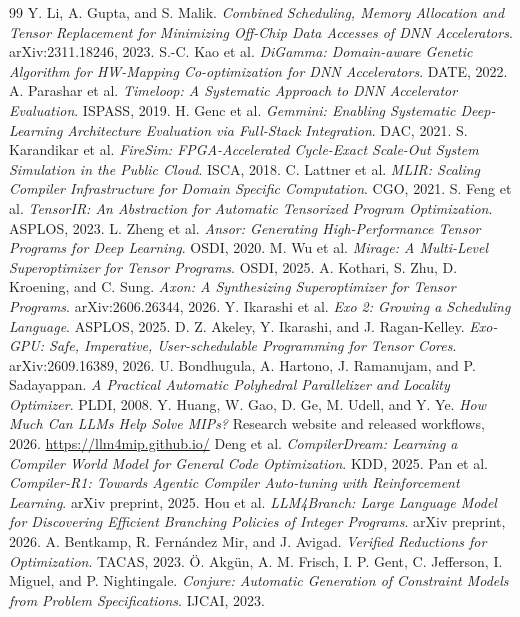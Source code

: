 \documentclass[11pt]{article}
\begin{document}
\begin{thebibliography}{99}
 Y. Li, A. Gupta, and S. Malik. \emph{Combined Scheduling, Memory Allocation and Tensor Replacement for Minimizing Off-Chip Data Accesses of DNN Accelerators}. arXiv:2311.18246, 2023.
 S.-C. Kao et al. \emph{DiGamma: Domain-aware Genetic Algorithm for HW-Mapping Co-optimization for DNN Accelerators}. DATE, 2022.
 A. Parashar et al. \emph{Timeloop: A Systematic Approach to DNN Accelerator Evaluation}. ISPASS, 2019.
 H. Genc et al. \emph{Gemmini: Enabling Systematic Deep-Learning Architecture Evaluation via Full-Stack Integration}. DAC, 2021.
 S. Karandikar et al. \emph{FireSim: FPGA-Accelerated Cycle-Exact Scale-Out System Simulation in the Public Cloud}. ISCA, 2018.
 C. Lattner et al. \emph{MLIR: Scaling Compiler Infrastructure for Domain Specific Computation}. CGO, 2021.
 S. Feng et al. \emph{TensorIR: An Abstraction for Automatic Tensorized Program Optimization}. ASPLOS, 2023.
 L. Zheng et al. \emph{Ansor: Generating High-Performance Tensor Programs for Deep Learning}. OSDI, 2020.
 M. Wu et al. \emph{Mirage: A Multi-Level Superoptimizer for Tensor Programs}. OSDI, 2025.
 A. Kothari, S. Zhu, D. Kroening, and C. Sung. \emph{Axon: A Synthesizing Superoptimizer for Tensor Programs}. arXiv:2606.26344, 2026.
 Y. Ikarashi et al. \emph{Exo 2: Growing a Scheduling Language}. ASPLOS, 2025.
 D. Z. Akeley, Y. Ikarashi, and J. Ragan-Kelley. \emph{Exo-GPU: Safe, Imperative, User-schedulable Programming for Tensor Cores}. arXiv:2609.16389, 2026.
 U. Bondhugula, A. Hartono, J. Ramanujam, and P. Sadayappan. \emph{A Practical Automatic Polyhedral Parallelizer and Locality Optimizer}. PLDI, 2008.
 Y. Huang, W. Gao, D. Ge, M. Udell, and Y. Ye. \emph{How Much Can LLMs Help Solve MIPs?} Research website and released workflows, 2026. \url{https://llm4mip.github.io/}
 Deng et al. \emph{CompilerDream: Learning a Compiler World Model for General Code Optimization}. KDD, 2025.
 Pan et al. \emph{Compiler-R1: Towards Agentic Compiler Auto-tuning with Reinforcement Learning}. arXiv preprint, 2025.
 Hou et al. \emph{LLM4Branch: Large Language Model for Discovering Efficient Branching Policies of Integer Programs}. arXiv preprint, 2026.
 A. Bentkamp, R. Fernández Mir, and J. Avigad. \emph{Verified Reductions for Optimization}. TACAS, 2023.
 Ö. Akgün, A. M. Frisch, I. P. Gent, C. Jefferson, I. Miguel, and P. Nightingale. \emph{Conjure: Automatic Generation of Constraint Models from Problem Specifications}. IJCAI, 2023.

\end{thebibliography}
\end{document}
